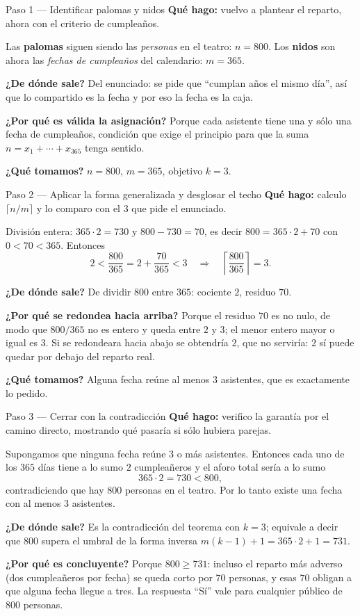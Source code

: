 \documentclass[11pt]{article}
\begin{document}
\begin{paso}{Paso 1 --- Identificar palomas y nidos}
\textbf{Qué hago:} vuelvo a plantear el reparto, ahora con el criterio de cumpleaños.

Las \textbf{palomas} siguen siendo las \emph{personas} en el teatro: $n=800$. Los \textbf{nidos} son ahora las \emph{fechas de cumpleaños} del calendario: $m=365$.

\textbf{¿De dónde sale?} Del enunciado: se pide que ``cumplan años el mismo día'', así que lo compartido es la fecha y por eso la fecha es la caja.

\textbf{¿Por qué es válida la asignación?} Porque cada asistente tiene una y sólo una fecha de cumpleaños, condición que exige el principio para que la suma $n=x_1+\cdots+x_{365}$ tenga sentido.

\textbf{¿Qué tomamos?} $n=800$, $m=365$, objetivo $k=3$.
\end{paso}

\begin{paso}{Paso 2 --- Aplicar la forma generalizada y desglosar el techo}
\textbf{Qué hago:} calculo $\lceil n/m\rceil$ y lo comparo con el $3$ que pide el enunciado.

División entera: $365\cdot 2 = 730$ y $800-730 = 70$, es decir $800 = 365\cdot 2 + 70$ con $0<70<365$. Entonces
\[
2<\frac{800}{365}=2+\frac{70}{365}<3
\quad\Longrightarrow\quad
\left\lceil \frac{800}{365} \right\rceil = 3 .
\]

\textbf{¿De dónde sale?} De dividir $800$ entre $365$: cociente $2$, residuo $70$.

\textbf{¿Por qué se redondea hacia arriba?} Porque el residuo $70$ es no nulo, de modo que $800/365$ no es entero y queda entre $2$ y $3$; el menor entero mayor o igual es $3$. Si se redondeara hacia abajo se obtendría $2$, que no serviría: $2$ sí puede quedar por debajo del reparto real.

\textbf{¿Qué tomamos?} Alguna fecha reúne al menos $3$ asistentes, que es exactamente lo pedido.
\end{paso}

\begin{paso}{Paso 3 --- Cerrar con la contradicción}
\textbf{Qué hago:} verifico la garantía por el camino directo, mostrando qué pasaría si sólo hubiera parejas.

Supongamos que ninguna fecha reúne $3$ o más asistentes. Entonces cada uno de los $365$ días tiene a lo sumo $2$ cumpleañeros y el aforo total sería a lo sumo
\[
365\cdot 2 = 730 < 800 ,
\]
contradiciendo que hay $800$ personas en el teatro. Por lo tanto existe una fecha con al menos $3$ asistentes.

\textbf{¿De dónde sale?} Es la contradicción del teorema con $k=3$; equivale a decir que $800$ supera el umbral de la forma inversa $m(k-1)+1 = 365\cdot 2+1 = 731$.

\textbf{¿Por qué es concluyente?} Porque $800\ge 731$: incluso el reparto más adverso (dos cumpleañeros por fecha) se queda corto por $70$ personas, y esas $70$ obligan a que alguna fecha llegue a tres. La respuesta ``Sí'' vale para cualquier público de $800$ personas.
\end{paso}
\end{document}
